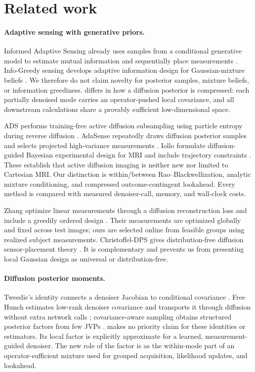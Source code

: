 \section{Related work}
\label{sec:related}

\paragraph{Adaptive sensing with generative priors.}
Informed Adaptive Sensing already uses samples from a conditional generative
model to estimate mutual information and sequentially place measurements
\cite{morssy2024informed}.  Info-Greedy sensing develops adaptive information
design for Gaussian-mixture beliefs \cite{braun2015infogreedy}.  We therefore
do not claim novelty for posterior samples, mixture beliefs, or information
greediness.  \method{} differs in how a diffusion posterior is compressed:
each partially denoised mode carries an operator-pushed local covariance, and
all downstream calculations share a provably sufficient low-dimensional
space.

ADS performs training-free active diffusion subsampling using particle
entropy during reverse diffusion \cite{nolan2025ads}.  AdaSense repeatedly
draws diffusion posterior samples and selects projected high-variance
measurements \cite{elata2024adasense}.  Iollo \etal{} formulate diffusion-guided
Bayesian experimental design for MRI and include trajectory constraints
\cite{iollo2025active}.  These establish that active diffusion imaging is
neither new nor limited to Cartesian MRI.  Our distinction is within/between
Rao--Blackwellization, analytic mixture conditioning, and compressed
outcome-contingent lookahead.  Every method is compared with measured
denoiser-call, memory, and wall-clock costs.

Zhang \etal{} optimize linear measurements through a diffusion reconstruction
loss and include a greedily ordered design \cite{zhang2025generalized}.  Their
measurements are optimized globally and fixed across test images; ours are
selected online from feasible groups using realized subject measurements.
Christoffel-DPS gives distribution-free diffusion sensor-placement theory
\cite{rowbottom2026christoffel}.  It is complementary and prevents us from
presenting local Gaussian design as universal or distribution-free.

\paragraph{Diffusion posterior moments.}
Tweedie's identity connects a denoiser Jacobian to conditional covariance
\cite{efron2011tweedie,manor2024posterior}.  Free Hunch estimates low-rank
denoiser covariance and transports it through diffusion without extra network
calls \cite{rissanen2025freehunch}; covariance-aware sampling obtains
structured posterior factors from few JVPs \cite{schioppa2026covariance}.
\method{} makes no priority claim for these identities or estimators.  Its
local factor is explicitly approximate for a learned, measurement-guided
denoiser.  The new role of the factor is as the within-mode part of an
operator-sufficient mixture used for grouped acquisition, likelihood updates,
and lookahead.

